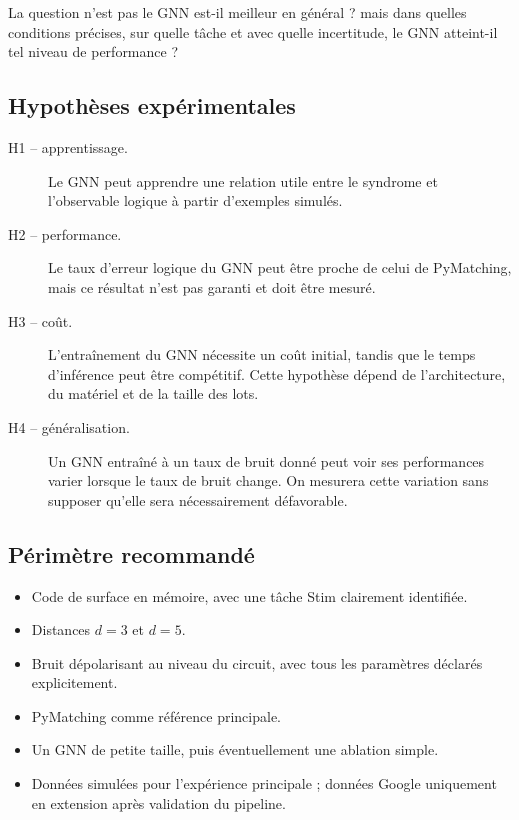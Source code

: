 \documentclass[11pt,a4paper]{article}
\begin{document}
La question n'est pas \og le GNN est-il meilleur en général ?\fg{} mais
\og dans quelles conditions précises, sur quelle tâche et avec quelle
incertitude, le GNN atteint-il tel niveau de performance ?\fg{}

\subsection{Hypothèses expérimentales}

\begin{description}
 \item[H1 -- apprentissage.] Le GNN peut apprendre une relation utile entre
 le syndrome et l'observable logique à partir d'exemples simulés.
 \item[H2 -- performance.] Le taux d'erreur logique du GNN peut être proche
 de celui de PyMatching, mais ce résultat n'est pas garanti et doit être
 mesuré.
 \item[H3 -- coût.] L'entraînement du GNN nécessite un coût initial, tandis
 que le temps d'inférence peut être compétitif. Cette hypothèse dépend de
 l'architecture, du matériel et de la taille des lots.
 \item[H4 -- généralisation.] Un GNN entraîné à un taux de bruit donné peut
 voir ses performances varier lorsque le taux de bruit change. On mesurera
 cette variation sans supposer qu'elle sera nécessairement défavorable.
\end{description}

\subsection{Périmètre recommandé}

\begin{itemize}
 \item Code de surface en mémoire, avec une tâche Stim clairement identifiée.
 \item Distances $d=3$ et $d=5$.
 \item Bruit dépolarisant au niveau du circuit, avec tous les paramètres
 déclarés explicitement.
 \item PyMatching comme référence principale.
 \item Un GNN de petite taille, puis éventuellement une ablation simple.
 \item Données simulées pour l'expérience principale ; données Google
 uniquement en extension après validation du pipeline.
\end{itemize}
\end{document}
